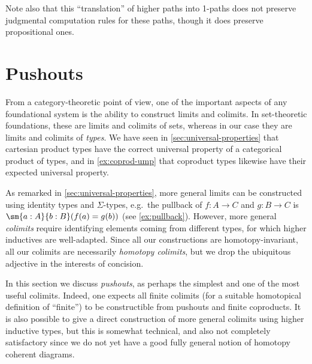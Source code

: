 \begin{rmk}
  Note also that this ``translation'' of higher paths into 1-paths does not preserve judgmental computation rules for these paths, though it does preserve propositional ones.
\end{rmk}

%
%

%


\section{Pushouts}
\label{sec:colimits}

%
%
%
%
From a category-theoretic point of view, one of the important aspects of any foundational system is the ability to construct limits and colimits.
In set-theoretic foundations, these are limits and colimits of sets, whereas in our case they are limits and colimits of \emph{types}.
We have seen in \cref{sec:universal-properties} that cartesian product types have the correct universal property of a categorical product of types, and in \cref{ex:coprod-ump} that coproduct types likewise have their expected universal property.

As remarked in \cref{sec:universal-properties}, more general limits can be constructed using identity types and $\Sigma$-types, e.g.\ the pullback of $f:A\to C$ and $g:B\to C$ is $\sm{a:A}{b:B} (f(a)=g(b))$ (see \cref{ex:pullback}).
However, more general \emph{colimits} require identifying elements coming from different types, for which higher inductives are well-adapted.
Since all our constructions are homotopy-invariant, all our colimits are necessarily \emph{homotopy colimits}, but we drop the ubiquitous adjective in the interests of concision.

In this section we discuss \emph{pushouts}, as perhaps the simplest and one of the most useful colimits.
Indeed, one expects all finite colimits (for a suitable homotopical definition of ``finite'') to be constructible from pushouts and finite coproducts.
It is also possible to give a direct construction of more general colimits using higher inductive types, but this is somewhat technical, and also not completely satisfactory since we do not yet have a good fully general notion of homotopy coherent diagrams.

